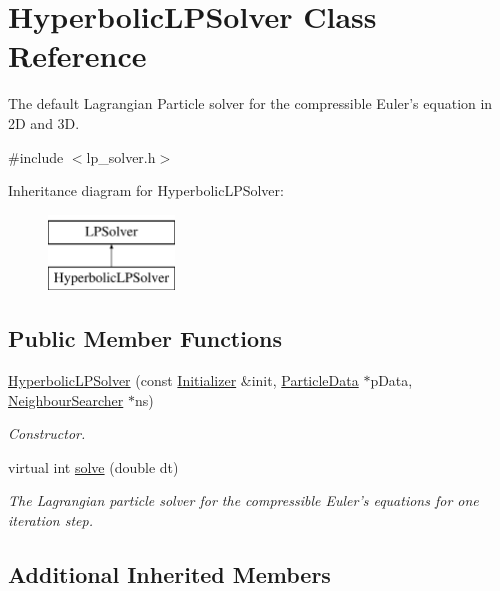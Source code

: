 \hypertarget{classHyperbolicLPSolver}{\section{Hyperbolic\-L\-P\-Solver Class Reference}
\label{classHyperbolicLPSolver}
}


The default Lagrangian Particle solver for the compressible Euler's equation in 2\-D and 3\-D.  




{\ttfamily \#include $<$lp\-\_\-solver.\-h$>$}

Inheritance diagram for Hyperbolic\-L\-P\-Solver\-:\begin{figure}[H]
\begin{center}
\leavevmode
\includegraphics[height=2.000000cm]{classHyperbolicLPSolver}
\end{center}
\end{figure}
\subsection*{Public Member Functions}
\begin{DoxyCompactItemize}
\item 
\hyperlink{classHyperbolicLPSolver_a1b2ef77e7ddeb0e569dd73d974a8402d}{Hyperbolic\-L\-P\-Solver} (const \hyperlink{classInitializer}{Initializer} \&init, \hyperlink{classParticleData}{Particle\-Data} $\ast$p\-Data, \hyperlink{classNeighbourSearcher}{Neighbour\-Searcher} $\ast$ns)
\begin{DoxyCompactList}\small\item\em Constructor. \end{DoxyCompactList}\item 
virtual int \hyperlink{classHyperbolicLPSolver_a8f8cbda5f22f052208cdc4d4d03dc567}{solve} (double dt)
\begin{DoxyCompactList}\small\item\em The Lagrangian particle solver for the compressible Euler's equations for one iteration step. \end{DoxyCompactList}\end{DoxyCompactItemize}
\subsection*{Additional Inherited Members}


